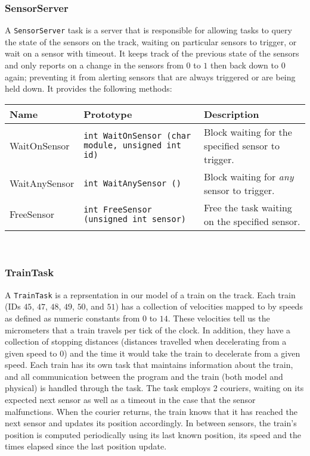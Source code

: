 \documentclass[12pt]{article}
\begin{document}
\subsubsection{SensorServer}
A {\tt SensorServer} task is a server that is responsible for allowing tasks to query the state of the sensors on the track, waiting on particular sensors to trigger, or wait on a sensor with timeout.  It keeps track of the previous state of the sensors and only reports on a change in the sensors from $0$ to $1$ then back down to $0$ again; preventing it from alerting sensors that are always triggered or are being held down.  It provides the following methods:
\begin{center}
  \begin{tabular}{|l|p{}|p{}|}
    \hline
    {\bf Name} & {\bf Prototype} & {\bf Description} \\\hline
    WaitOnSensor & {\tt int WaitOnSensor (char module, unsigned int id)} & Block waiting for the specified sensor to trigger. \\\hline
    WaitAnySensor & {\tt int WaitAnySensor ()} & Block waiting for {\it any} sensor to trigger. \\\hline
    FreeSensor & {\tt int FreeSensor (unsigned int sensor)} & Free the task waiting on the specified sensor. \\\hline
  \end{tabular}
  \\
\end{center}
\subsubsection{TrainTask}
A {\tt TrainTask} is a reprsentation in our model of a train on the track.  Each train (IDs $45$, $47$, $48$, $49$, $50$, and $51$) has a collection of velocities mapped to by speeds as defined as numeric constants from $0$ to $14$.  These velocities tell us the micrometers that a train travels per tick of the clock.  In addition, they have a collection of stopping distances (distances travelled when decelerating from a given speed to $0$) and the time it would take the train to decelerate from a given speed.  Each train has its own task that maintains information about the train, and all communication between the program and the train (both model and physical) is handled through the task. The task employs 2 couriers, waiting on its expected next sensor as well as a timeout in the case that the sensor malfunctions. When the courier returns, the train knows that it has reached the next sensor and updates its position accordingly. In between sensors, the train's position is
computed periodically using its last known position, its speed and the times elapsed since the last position update.
\end{document}
